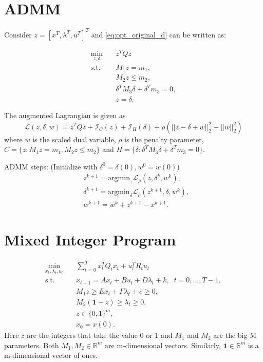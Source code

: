 \documentclass{article}
\begin{document}
\section{ADMM}
Consider $z = [x^T, \lambda^T, u^T]^T$ and \eqref{eq:opt_original_d} can be written as:

\begin{equation}
\begin{aligned}
\min_{z, \delta} \quad & z^T Q z \\
\textrm{s.t.} \quad & M_1 z = m_1,\\
& M_2 z \leq m_2, \\
& \delta^T M_3 \delta + \delta^T m_3 = 0, \\
& z = \delta.
\end{aligned}
\end{equation}

The augmented Lagrangian is given as
\begin{equation*}
	\mathcal{L}(z, \delta, w) = z^T Q z + \mathcal{I}_C(z) + \mathcal{I}_H (\delta) + \rho ( ||z - \delta + w||_2^2 - ||w||_2^2)
\end{equation*}
where $w$ is the scaled dual variable, $\rho$ is the penalty parameter, $C = \{ z : M_1 z = m_1,  M_2 z \leq m_2  \}$ and $H = \{ \delta : \delta^T M_3 \delta + \delta^T m_3 = 0  \}$.

ADMM steps: (Initialize with $\delta^0 = \delta(0), w^0 = w(0)$)
\begin{align*}
	& z^{k+1} = \text{argmin}_z \mathcal{L}_\rho (z, \delta^k, w^k), \\
	& \delta^{k+1} = \text{argmin}_\delta \mathcal{L}_\rho (z^{k+1}, \delta, w^k), \\
	& w^{k+1} = w^k + z^{k+1} - x^{k+1}.
\end{align*}

\section{Mixed Integer Program}

\begin{equation}
\label{eq:opt_original_d}
\begin{aligned}
\min_{x_t, \lambda_t, u_t} \quad & \sum_{t=0}^T x_t^T Q_t x_t + u_t^T R_t u_t  \\
\textrm{s.t.} \quad &x_{t+1} = A x_t + B u_t + D \lambda_t + k, \; \; t = 0, \ldots, T-1,\\
& M_1 z \geq E x_t + F \lambda_t + c \geq 0, \\
& M_2 (\mathbf{1} - z) \geq \lambda_t \geq 0, \\
& z \in \{ 0,1  \}^m, \\
& x_0 = x(0).
\end{aligned}
\end{equation}
Here $z$ are the integers that take the value 0 or 1 and $M_1$ and $M_2$ are the big-M parameters. Both $M_1, M_2 \in \mathbb{R}^m$ are m-dimensional vectors. Similarly, $\mathbf{1} \in \mathbb{R}^m$ is a m-dimensional vector of ones.
\end{document}
